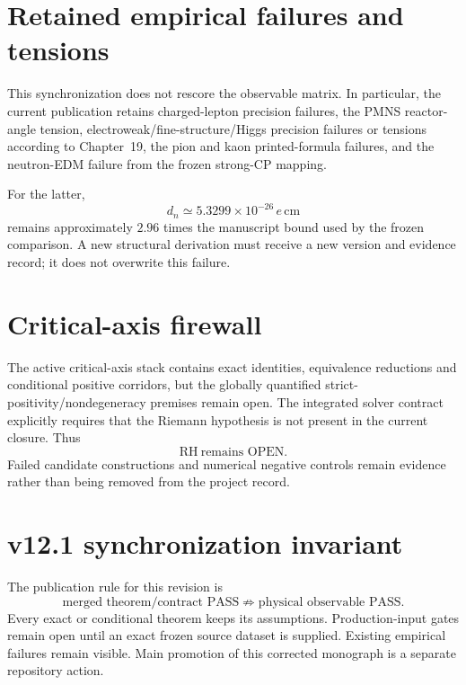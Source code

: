 \section{Retained empirical failures and tensions}

This synchronization does not rescore the observable matrix.  In particular,
the current publication retains charged-lepton precision failures, the PMNS
reactor-angle tension, electroweak/fine-structure/Higgs precision failures or
tensions according to Chapter~19, the pion and kaon printed-formula failures,
and the neutron-EDM failure from the frozen strong-CP mapping.

For the latter,
\[
d_n\simeq5.3299\times10^{-26}\,e\,\mathrm{cm}
\]
remains approximately \(2.96\) times the manuscript bound used by the frozen
comparison.  A new structural derivation must receive a new version and evidence
record; it does not overwrite this failure.

\section{Critical-axis firewall}

The active critical-axis stack contains exact identities, equivalence
reductions and conditional positive corridors, but the globally quantified
strict-positivity/nondegeneracy premises remain open.  The integrated solver
contract explicitly requires that the Riemann hypothesis is not present in the
current closure.  Thus
\[
\boxed{\mathrm{RH}\ \text{remains OPEN}.}
\]
Failed candidate constructions and numerical negative controls remain evidence
rather than being removed from the project record.

\section{v12.1 synchronization invariant}

The publication rule for this revision is
\[
\boxed{
\text{merged theorem/contract PASS}
\not\Rightarrow
\text{physical observable PASS}.
}
\]
Every exact or conditional theorem keeps its assumptions.  Production-input
gates remain open until an exact frozen source dataset is supplied.  Existing
empirical failures remain visible.  Main promotion of this corrected monograph
is a separate repository action.

